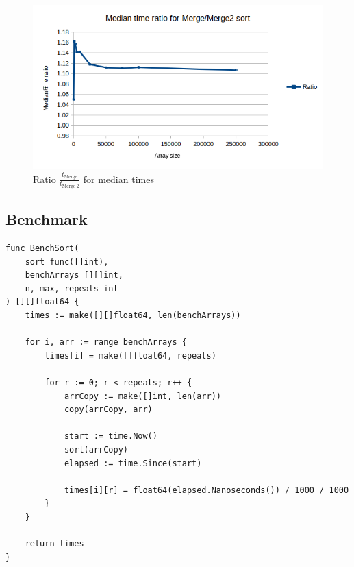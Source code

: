 \documentclass[a4paper,11pt]{article}
\begin{document}
    \begin{figure}[H]
        \centering
        \includegraphics[width=\textwidth]{ratio.png}
        \caption{Ratio $\frac{t_{\text{Merge}}}{t_{\text{Merge 2}}}$ for median times}
        \label{fig:ratio}
    \end{figure}

    \begin{appendices}
        \section{Benchmark}
        \label{appendix:benchmark}
        \begin{verbatim}
func BenchSort(
    sort func([]int),
    benchArrays [][]int,
    n, max, repeats int
) [][]float64 {
    times := make([][]float64, len(benchArrays))

    for i, arr := range benchArrays {
        times[i] = make([]float64, repeats)

        for r := 0; r < repeats; r++ {
            arrCopy := make([]int, len(arr))
            copy(arrCopy, arr)

            start := time.Now()
            sort(arrCopy)
            elapsed := time.Since(start)

            times[i][r] = float64(elapsed.Nanoseconds()) / 1000 / 1000
        }
    }

    return times
}
        \end{verbatim}
    \end{appendices}
\end{document}
